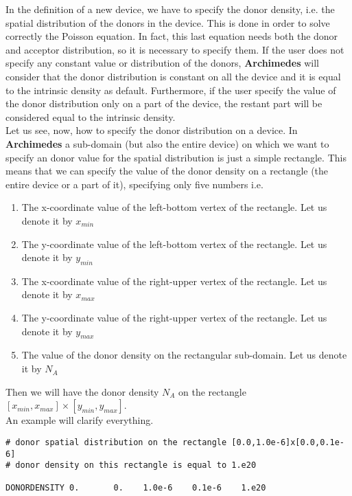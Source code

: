 \documentclass[12pt]{book}
\begin{document}
In the definition of a new device, we have to specify the donor density, i.e. the spatial distribution of the donors in the device. This is done in order to solve correctly the Poisson equation. In fact, this last equation needs both the donor and acceptor distribution, so it is necessary to specify them. If the user does not specify any constant value or distribution of the donors, \textbf{Archimedes} will consider that the donor distribution is constant on all the device and it is equal to the intrinsic density as default. Furthermore, if the user specify the value of the donor distribution only on a part of the device, the restant part will be considered equal to the intrinsic density.
\\
Let us see, now, how to specify the donor distribution on a device.
In \textbf{Archimedes} a sub-domain (but also the entire device) on which we want to specify an donor value for the spatial distribution is just a simple rectangle. This means that we can specify the value of the donor density on a rectangle (the entire device or a part of it), specifying only five numbers i.e.
\begin{enumerate}
\item
The x-coordinate value of the left-bottom vertex of the rectangle. Let us denote it by $x_{min}$
\item
The y-coordinate value of the left-bottom vertex of the rectangle. Let us denote it by $y_{min}$
\item
The x-coordinate value of the right-upper vertex of the rectangle. Let us denote it by $x_{max}$
\item
The y-coordinate value of the right-upper vertex of the rectangle. Let us denote it by $y_{max}$
\item
The value of the donor density on the rectangular sub-domain. Let us denote it by $N_A$
\end{enumerate}
Then we will have the donor density $N_A$ on the rectangle $[x_{min},x_{max}] \times [y_{min},y_{max}]$.\\

An example will clarify everything.

\begin{verbatim}
# donor spatial distribution on the rectangle [0.0,1.0e-6]x[0.0,0.1e-6]
# donor density on this rectangle is equal to 1.e20

DONORDENSITY 0.       0.    1.0e-6    0.1e-6    1.e20

\end{verbatim}
\end{document}
